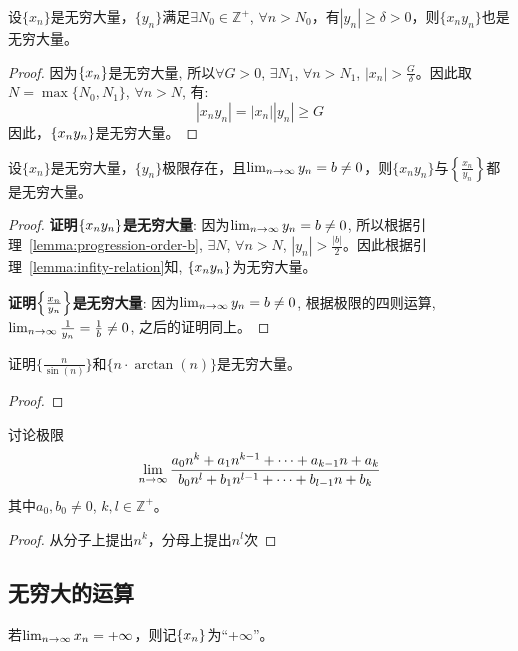 \begin{lemma}\label{lemma:infity-relation}
    设$\{ x_n \}$是无穷大量，$\{ y_n \}$满足$\exists N_0 \in \mathbb{Z}^+$, $\forall n > N_0$，有$| y_n | \ge \delta > 0$，则$\{ x_n y_n\}$也是无穷大量。
\end{lemma}
\begin{proof}
    因为$\left\{ x_n\right\}$是无穷大量, 所以$\forall G > 0$, $\exists N_1$, $\forall n > N_1$, $|x_n| > \frac{G}{\delta}$。因此取$N = \max\{N_0, N_1\}$, $\forall n > N$, 有:
    \begin{equation*}
        |x_ny_n| = |x_n||y_n| \ge G
    \end{equation*}
    因此，$\left\{ x_ny_n\right\}$是无穷大量。
\end{proof}

\begin{lemma}
    设$\{ x_n \}$是无穷大量，$\{ y_n \}$极限存在，且$\lim_{n \to \infty } y_n = b \ne 0$，则$\{ x_n y_n\}$与$\left\{ \frac{x_n}{y_n} \right\}$都是无穷大量。
\end{lemma}
\begin{proof}
    {\bf 证明$\left\{ x_ny_n\right\}$是无穷大量}:
    因为$\lim_{n \to \infty } y_n = b \ne 0$, 所以根据引理~\ref{lemma:progression-order-b}, $\exists N$, $\forall n > N$, $|y_n| > \frac{|b|}{2}$。因此根据引理~\ref{lemma:infity-relation}知, $\left\{ x_ny_n\right\}$为无穷大量。

    {\bf 证明$\left\{ \frac{x_n}{y_n}\right\}$是无穷大量}:
    因为$\lim_{n \to \infty } y_n = b \ne 0$, 根据极限的四则运算, $\lim_{n \to \infty } \frac{1}{y_n} = \frac{1}{b} \ne 0$, 之后的证明同上。
\end{proof}

\begin{example}
    证明$\{ \frac{n}{\sin(n)}\}$和$\{ n \cdot \arctan(n)\}$是无穷大量。
\end{example}
\begin{proof}
\end{proof}

\begin{example}
    讨论极限
    \[ \lim_{n \to \infty} \frac{a_0 n^k + a_1 n^{k - 1} + \cdots + a_{k - 1} n + a_k}{b_0 n^l + b_1 n^{l - 1} + \cdots + b_{l - 1} n + b_k}\]
    其中$a_0, b_0 \ne 0$, $k, l \in \mathbb{Z}^+$。
\end{example}
\begin{proof}
    从分子上提出$n^k$，分母上提出$n^l$次
\end{proof}
\subsection{无穷大的运算}
若$\lim_{n \to \infty } x_n = +\infty$，则记$\left\{ x_n\right\}$为``+$\infty$''。

